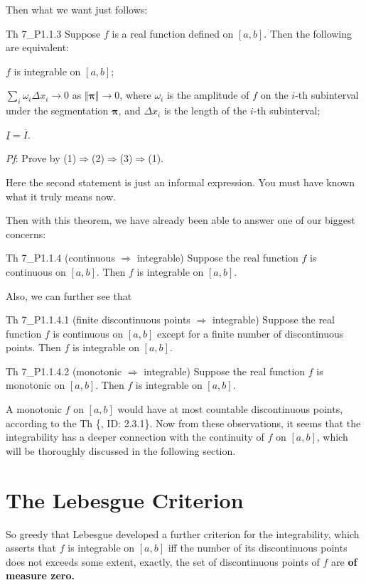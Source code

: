 \documentclass{article}
\begin{document}
Then what we want just follows:

\begin{Th}{Th 7\_P1.1.3}
    Suppose $f$ is a real function defined on $[a,b]$. Then the following are equivalent:
    \begin{compactenum}
        \item $f$ is integrable on $[a,b]$;
        \item $\sum_{i} \omega_i\Delta x_i \rightarrow 0$ as $\Vert\pmb{\pi}\Vert\to 0$, where $\omega_i$ is the amplitude of $f$ on the $i$-th subinterval under the segmentation $\pmb{\pi}$, and $\Delta x_i$ is the length of the $i$-th subinterval;
        \item $\underline{I} = \overline{I}$.
    \end{compactenum}
    \tcblower
    \textit{Pf}: Prove by (1)$\Rightarrow$(2)$\Rightarrow$(3)$\Rightarrow$(1).
\end{Th}
Here the second statement is just an informal expression. You must have known what it truly means now.

Then with this theorem, we have already been able to answer one of our biggest concerns:

\begin{Th}{Th 7\_P1.1.4 (continuous $\Rightarrow$ integrable)}
    Suppose the real function $f$ is continuous on $[a,b]$. Then $f$ is integrable on $[a,b]$.
\end{Th}

Also, we can further see that 

\begin{Th}{Th 7\_P1.1.4.1 (finite discontinuous points $\Rightarrow$ integrable)}
    Suppose the real function $f$ is continuous on $[a,b]$ except for a finite number of discontinuous points. Then $f$ is integrable on $[a,b]$.
\end{Th}

\begin{Th}{Th 7\_P1.1.4.2 (monotonic $\Rightarrow$ integrable)}
    Suppose the real function $f$ is monotonic on $[a,b]$. Then $f$ is integrable on $[a,b]$.
\end{Th}

A monotonic $f$ on $[a,b]$ would have at most countable discontinuous points, according to the Th \{, ID: 2.3.1\}. Now from these observations, it seems that the integrability has a deeper connection with the continuity of $f$ on $[a,b]$, which will be thoroughly discussed in the following section.

\section{The Lebesgue Criterion}
So greedy that Lebesgue developed a further criterion for the integrability, which asserts that $f$ is integrable on $[a,b]$ iff the number of its discontinuous points does not exceeds some extent, exactly, the set of discontinuous points of $f$ are \textbf{of measure zero.}
\end{document}
